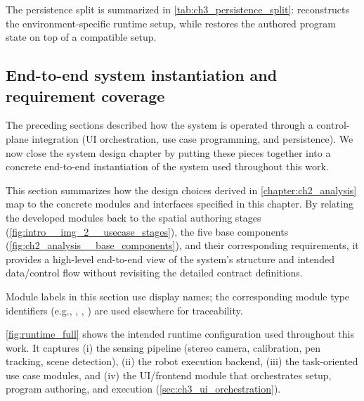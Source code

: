 The persistence split is summarized in \autoref{tab:ch3_persistence_split}:  reconstructs the environment-specific runtime setup, while  restores the authored program state on top of a compatible setup.





\subsection[End-to-end system and requirement coverage]{End-to-end system instantiation and requirement coverage}
\label{sec:ch3_demo_configuration}

The preceding sections described how the system is operated through a control-plane integration (UI orchestration, use case programming, and persistence). We now close the system design chapter by putting these pieces together into a concrete end-to-end instantiation of the system used throughout this work.

This section summarizes how the design choices derived in \autoref{chapter:ch2_analysis} map to the concrete modules and interfaces specified in this chapter. By relating the developed modules back to the spatial authoring stages (\autoref{fig:intro__img_2__usecase_stages}), the five base components (\autoref{fig:ch2_analysis__base_components}), and their corresponding requirements, it provides a high-level end-to-end view of the system's structure and intended data/control flow without revisiting the detailed contract definitions.

Module labels in this section use display names; the corresponding module type identifiers (e.g., , , ) are used elsewhere for traceability.

\autoref{fig:runtime_full} shows the intended runtime configuration used throughout this work.
It captures (i) the sensing pipeline (stereo camera, calibration, pen tracking, scene detection),
(ii) the robot execution backend, (iii) the task-oriented use case modules, and (iv) the UI/frontend module that orchestrates setup, program authoring, and execution (\autoref{sec:ch3_ui_orchestration}).

